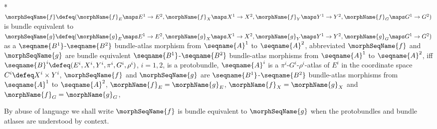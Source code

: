 \documentclass{article}
\begin{document}
\begin{definition}
\label{def:Bun-ATLmorphequiv}
\leavevmode
\\*
$
  \morphSeqName{f}
  \defeq
  (
    \morphName{f}_E \maps E^1 \to E^2,
    \morphName{f}_X \maps X^1 \to X^2,
    \morphName{f}_Y \maps Y^1 \to Y^2,
    \morphName{f}_G \maps G^1 \to G^2
  )
$
is bundle equivalent to
$
  \morphSeqName{g}
  \defeq
  (
    \morphName{g}_E \maps E^1 \to E^2,
    \morphName{g}_X \maps X^1 \to X^2,
    \morphName{g}_Y \maps Y^1 \to Y^2,
    \morphName{g}_G \maps G^1 \to G^2
  )
$
as a $\seqname{B^1}$-$\seqname{B^2}$ bundle-atlas morphism from
$\seqname{A}^1$ to $\seqname{A}^2$, abbreviated $\morphSeqName{f}$ and
$\morphSeqName{g}$ are bundle equivalent $\seqname{B^1}$-$\seqname{B^2}$
bundle-atlas morphisms from $\seqname{A}^1$ to $\seqname{A}^2$, iff
$
  \seqname{B}^i
  \defeq
  (
    E^i,
    X^i,
    Y^i,
    \pi^i,
    G^i,
    \rho^i
  )
$,
$i=1,2$, is a protobundle, $\seqname{A}^i$ is a
$\pi^i$-$G^i$-$\rho^i$-atlas of $E^i$ in the coordinate space
$C^i \defeq X^i \times Y^i$, $\morphSeqName{f}$ and $\morphSeqName{g}$ are
$\seqname{B^1}$-$\seqname{B^2}$ bundle-atlas morphisms from
$\seqname{A}^1$ to $\seqname{A}^2$, $\morphName{f}_E = \morphName{g}_E$,
$\morphName{f}_X = \morphName{g}_X$ and $\morphName{f}_G = \morphName{g}_G$,

By abuse of language we shall write $\morphSeqName{f}$ is bundle
equivalent to $\morphSeqName{g}$ when the protobundles and bundle
atlases are understood by context.
\end{definition}
\end{document}
